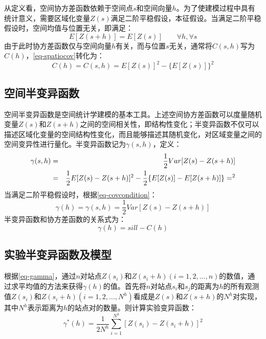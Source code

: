 从定义看，空间协方差函数依赖于空间点$s$和空间向量$h$。为了使建模过程中具有统计意义，需要区域化变量$Z(s)$满足二阶平稳假设，本征假设。当满足二阶平稳假设时，空间均值与位置无关，即满足：
\begin{equation}
    E[Z(s+h)] = E[Z(s)] \qquad \forall h,\forall s
    \label{eq-covcondition}
\end{equation}
由于此时协方差函数仅与空间向量$h$有关，而与位置$s$无关，通常将$C(s,h)$写为$C(h)$，\cref{eq-spatiocov}转化为：
\begin{equation}
    C(h)=C(s,h) = E[Z(s)]^2 - \{ E[Z(s)] \}^2
    \label{eq-conditionalcov}
\end{equation}

\subsection{空间半变异函数}
空间半变异函数是空间统计学建模的基本工具。上述\textcolor[rgb]{1,0,0}{空间协方差函数可以度量随机变量$Z(s)$和$Z(s+h)$之间的空间相关性，即结构性变化}；半变异函数不仅可以描述区域化变量的空间结构性变化，而且能够描述其随机变化，对区域变量之间的空间变异性进行量化。半变异函数记为$\gamma(s,h)$，定义：
\begin{eqnarray}
    \gamma(s,h) &=&\dfrac{1}{2}Var[Z(s)-Z(s+h)] \notag \\
    &=& \dfrac{1}{2}E[Z(s)-Z(s+h)]^2 - \dfrac{1}{2}\{ E[Z(s)] - E[Z(s+h)] \}=^2 
    \label{eq-gammapre}
\end{eqnarray}
当满足二阶平稳假设时，根据\cref{eq-covcondition}：
\begin{equation}
    \gamma(h) = \gamma(s,h) = \dfrac{1}{2}Var[Z(s) - Z(s+h)]
    \label{eq-gamma}
\end{equation}
半变异函数和协方差函数的关系式为：
\begin{equation}
    \gamma(h) = sill-C(h)
    \label{eq-gammacov}
\end{equation}

\subsection{实验半变异函数及模型}

根据\cref{eq-gamma}，通过$n$对站点$Z(s_i)$和$Z(s_i+h)(i=1,2,\dots,n)$的数值，通过求平均值的方法来获得$\gamma(h)$的值。首先将$n$对站点$s_i$和$s_j$的距离为$h$的所有观测值$Z(s_i)$和$Z(s_i+h)(i=1,2,\dots,N^h)$看成是$Z(s)$和$Z(s+h)$的$N^h$对实现，其中$N^h$表示距离为$h$的站点对的数量。则计算实验变异函数：
\begin{equation}
    \gamma^*(h) = \dfrac{1}{2N^h}\sum\limits_{i=1}^{N^h}\left[ Z(s_i)-Z(s_i+h) \right]^2
    \label{eq-realisticgamma}
\end{equation}


